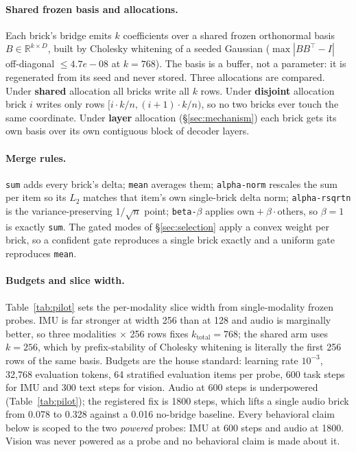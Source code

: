 \documentclass[11pt]{article}
\begin{document}
\paragraph{Shared frozen basis and allocations.}
Each brick's bridge emits $k$ coefficients over a shared frozen orthonormal basis $B \in \mathbb{R}^{k \times D}$, built by Cholesky whitening of a seeded Gaussian ($\max |BB^\top - I|$ off-diagonal $\le 4.7e-08$ at $k = 768$). The basis is a buffer, not a parameter: it is regenerated from its seed and never stored. Three allocations are compared. Under \textbf{shared} allocation all bricks write all $k$ rows. Under \textbf{disjoint} allocation brick $i$ writes only rows $[i \cdot k/n, (i{+}1) \cdot k/n)$, so no two bricks ever touch the same coordinate. Under \textbf{layer} allocation (\S\ref{sec:mechanism}) each brick gets its own basis over its own contiguous block of decoder layers.

\paragraph{Merge rules.}
\texttt{sum} adds every brick's delta; \texttt{mean} averages them; \texttt{alpha-norm} rescales the sum per item so its $L_2$ matches that item's own single-brick delta norm; \texttt{alpha-rsqrtn} is the variance-preserving $1/\sqrt{n}$ point; \texttt{beta-}$\beta$ applies $\mathrm{own} + \beta \cdot \mathrm{others}$, so $\beta = 1$ is exactly \texttt{sum}. The gated modes of \S\ref{sec:selection} apply a convex weight per brick, so a confident gate reproduces a single brick exactly and a uniform gate reproduces \texttt{mean}.

\paragraph{Budgets and slice width.}
Table~\ref{tab:pilot} sets the per-modality slice width from single-modality frozen probes. IMU is far stronger at width 256 than at 128 and audio is marginally better, so three modalities $\times$ 256 rows fixes $k_{\mathrm{total}} = 768$; the shared arm uses $k = 256$, which by prefix-stability of Cholesky whitening is literally the first 256 rows of the same basis. Budgets are the house standard: learning rate $10^{-3}$, 32{,}768 evaluation tokens, 64 stratified evaluation items per probe, 600 task steps for IMU and 300 text steps for vision. Audio at 600 steps is underpowered (Table~\ref{tab:pilot}); the registered fix is 1800 steps, which lifts a single audio brick from 0.078 to 0.328 against a 0.016 no-bridge baseline. Every behavioral claim below is scoped to the two \emph{powered} probes: IMU at 600 steps and audio at 1800. Vision was never powered as a probe and no behavioral claim is made about it.
\end{document}
